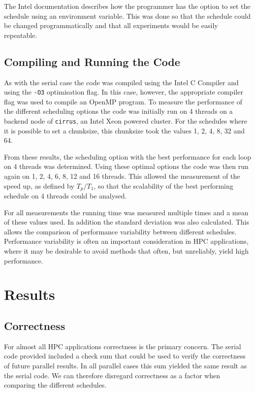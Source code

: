 \documentclass[a4paper,12pt]{article}
\begin{document}
The Intel documentation \cite{intelmp} describes how the programmer has the option to set the schedule using an environment variable. This was done so that the schedule could be changed programmatically and that all experiments would be easily repeatable.

\subsection{Compiling and Running the Code}

As with the serial case the code was compiled using the Intel C Compiler and using the \verb|-O3| optimisation flag. In this case, however, the appropriate compiler flag was used to compile an OpenMP program. To measure the performance of the different scheduling options the code was initially run on 4 threads on a backend node of \verb|cirrus|, an Intel Xeon powered cluster. For the schedules where it is possible to set a chunksize, this chunksize took the values 1, 2, 4, 8, 32 and 64.

From these results, the scheduling option with the best performance for each loop on 4 threads was determined. Using these optimal options the code was then run again on 1, 2, 4, 6, 8, 12 and 16 threads. This allowed the measurement of the speed up, as defined by $T_{p}/T_{1}$, so that the scalability of the best performing schedule on 4 threads could be analysed.

For all measurements the running time was measured multiple times and a mean of these values used. In addition the standard deviation was also calculated. This allows the comparison of performance variability between different schedules. Performance variability is often an important consideration in HPC applications, where it may be desirable to avoid methods that often, but unreliably, yield high performance.

\section{Results}
\subsection{Correctness}
For almost all HPC applications correctness is the primary concern. The serial code provided included a check sum that could be used to verify the correctness of future parallel results. In all parallel cases this sum yielded the same result as the serial code. We can therefore disregard correctness as a factor when comparing the different schedules. 
\end{document}

